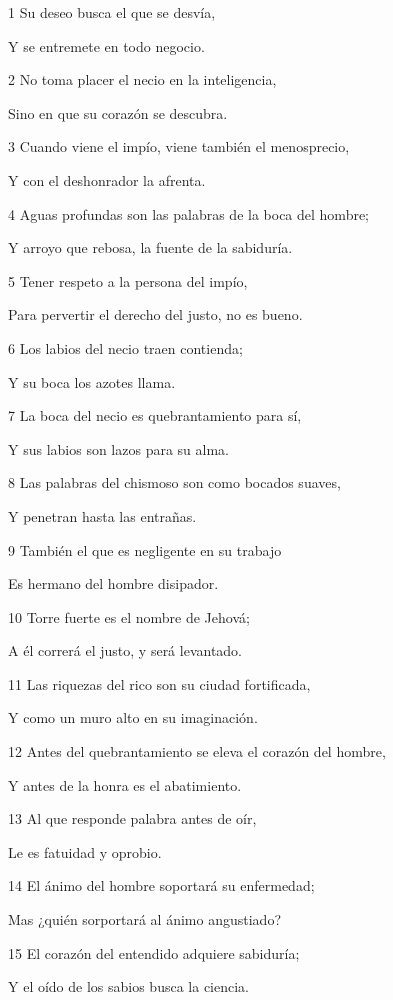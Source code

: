 \par 1 Su deseo busca el que se desvía,
\par Y se entremete en todo negocio.
\par 2 No toma placer el necio en la inteligencia,
\par Sino en que su corazón se descubra.
\par 3 Cuando viene el impío, viene también el menosprecio,
\par Y con el deshonrador la afrenta.
\par 4 Aguas profundas son las palabras de la boca del hombre;
\par Y arroyo que rebosa, la fuente de la sabiduría.
\par 5 Tener respeto a la persona del impío,
\par Para pervertir el derecho del justo, no es bueno.
\par 6 Los labios del necio traen contienda; 
\par Y su boca los azotes llama.
\par 7 La boca del necio es quebrantamiento para sí,
\par Y sus labios son lazos para su alma.
\par 8 Las palabras del chismoso son como bocados suaves,
\par Y penetran hasta las entrañas.
\par 9 También el que es negligente en su trabajo
\par Es hermano del hombre disipador.
\par 10 Torre fuerte es el nombre de Jehová;
\par A él correrá el justo, y será levantado.
\par 11 Las riquezas del rico son su ciudad fortificada,
\par Y como un muro alto en su imaginación.
\par 12 Antes del quebrantamiento se eleva el corazón del hombre,
\par Y antes de la honra es el abatimiento.
\par 13 Al que responde palabra antes de oír,
\par Le es fatuidad y oprobio.
\par 14 El ánimo del hombre soportará su enfermedad;
\par Mas ¿quién sorportará al ánimo angustiado?
\par 15 El corazón del entendido adquiere sabiduría;
\par Y el oído de los sabios busca la ciencia.
